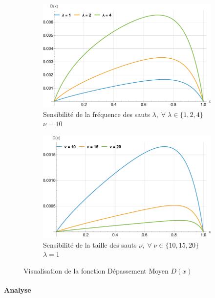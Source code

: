 \begin{figure}[htb]
    \centering
    \begin{subfigure}{0.45\linewidth}
        \includegraphics[width=\linewidth]{img/validation/Ovs/overshoot_lambda.pdf}
        \caption{Sensibilité de la fréquence des sauts $\lambda,\;\forall\;\lambda\in\{1,2,4\}$ \textendash~$\nu=10$}\label{fig:Overshoot_lambda_visualisation}
    \end{subfigure}
    \hfill
    \begin{subfigure}{0.45\linewidth}
        \includegraphics[width=\linewidth]{img/validation/Ovs/overshoot_nu.pdf}
        \caption{Sensibilité de la taille des sauts $\nu,\;\forall\;\nu\in\{10,15,20\}$  \textendash~$\lambda=1$}\label{fig:Overshoot_nu_visualisation}
    \end{subfigure}
    \hfill
    \caption{Visualisation de la fonction Dépassement Moyen $D(x)$}\label{fig:OvershootVisualisation}
\end{figure}
\FloatBarrier\paragraph{Analyse}\phantom{}\\
